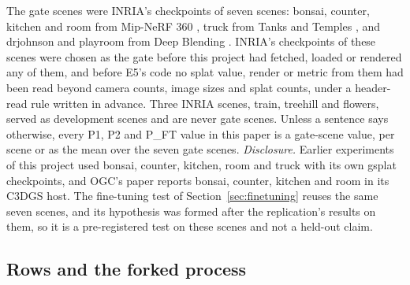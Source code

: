 The gate scenes were INRIA's checkpoints of seven scenes: bonsai, counter, kitchen and room from Mip-NeRF 360 \citep{barron2022mipnerf360}, truck from Tanks and Temples \citep{knapitsch2017tanks}, and drjohnson and playroom from Deep Blending \citep{hedman2018deep}. %
INRIA's checkpoints of these scenes were chosen as the gate before this project had fetched, loaded or rendered any of them, and before E5's code no splat value, render or metric from them had been read beyond camera counts, image sizes and splat counts, under a header-read rule written in advance. %
Three INRIA scenes, train, treehill and flowers, served as development scenes and are never gate scenes. %
Unless a sentence says otherwise, every P1, P2 and P\_FT value in this paper is a gate-scene value, per scene or as the mean over the seven gate scenes. %
\emph{Disclosure.} Earlier experiments of this project used bonsai, counter, kitchen, room and truck with its own gsplat checkpoints, and OGC's paper reports bonsai, counter, kitchen and room in its C3DGS host. %
The fine-tuning test of Section~\ref{sec:finetuning} reuses the same seven scenes, and its hypothesis was formed after the replication's results on them, so it is a pre-registered test on these scenes and not a held-out claim. %

\subsection{Rows and the forked process}

